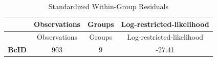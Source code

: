 \documentclass[]{article}
\begin{document}
\begin{longtable}[]{@{}cccc@{}}
\caption{Standardized Within-Group Residuals}\tabularnewline
\toprule
\begin{minipage}[b]{0.14\columnwidth}\centering\strut
~\strut
\end{minipage} & \begin{minipage}[b]{0.18\columnwidth}\centering\strut
Observations\strut
\end{minipage} & \begin{minipage}[b]{0.11\columnwidth}\centering\strut
Groups\strut
\end{minipage} & \begin{minipage}[b]{0.33\columnwidth}\centering\strut
Log-restricted-likelihood\strut
\end{minipage}\tabularnewline
\midrule
\endfirsthead
\toprule
\begin{minipage}[b]{0.14\columnwidth}\centering\strut
~\strut
\end{minipage} & \begin{minipage}[b]{0.18\columnwidth}\centering\strut
Observations\strut
\end{minipage} & \begin{minipage}[b]{0.11\columnwidth}\centering\strut
Groups\strut
\end{minipage} & \begin{minipage}[b]{0.33\columnwidth}\centering\strut
Log-restricted-likelihood\strut
\end{minipage}\tabularnewline
\midrule
\endhead
\begin{minipage}[t]{0.14\columnwidth}\centering\strut
\textbf{BcID}\strut
\end{minipage} & \begin{minipage}[t]{0.18\columnwidth}\centering\strut
903\strut
\end{minipage} & \begin{minipage}[t]{0.11\columnwidth}\centering\strut
9\strut
\end{minipage} & \begin{minipage}[t]{0.33\columnwidth}\centering\strut
-27.41\strut
\end{minipage}\tabularnewline
\bottomrule
\end{longtable}
\end{document}
